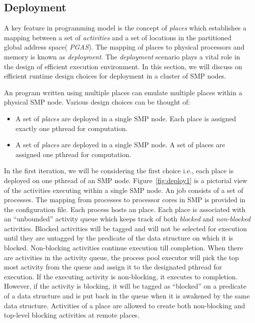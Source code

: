 \subsection{Deployment}
\label{sec:deploy}

A key feature in \Xten{} programming model is the concept of {\it
places} which establishes a mapping between a set of {\it activities}
and a set of locations in the partitioned global address space({\it
PGAS}). The mapping of places to physical processors and memory is
known as {\it deployment}. The {\it deployment} scenario plays a vital
role in the design of efficient \Xten{} execution environment. In this
section, we will discuss on efficient \Xten{} runtime design choices
for deployment in a cluster of SMP nodes.

An \Xten{} program written using multiple places can emulate multiple
places within a physical SMP node. Various design choices can be
thought of:

\begin{itemize}
\item A set of \Xten{} {\it places} are deployed in a single SMP node.
Each \Xten{} place is assigned exactly one pthread for computation.

\item A set of \Xten{} {\it places} are deployed in a single SMP node.
A set of \Xten{} places are assigned one pthread for computation.
\end{itemize}

In the first iteration, we will be considering the first choice i.e.,
each \Xten{} place is deployed on one pthread of an SMP
node. Figure~\ref{fig:deploy1} is a pictorial view of the activities
executing within a single SMP node. An \Xten{} job consists of a set
of \Xten{} processes. The mapping from processes to processor cores in SMP
is provided in the configuration file. Each \Xten{} process hosts an
\Xten{} place. Each \Xten{} place is associated with an ``unbounded'' 
activity queue which keeps track of both {\it blocked} and {\it
non-blocked} activities. Blocked activities will be tagged and will
not be selected for execution until they are untagged by the predicate
of the data structure on which it is blocked. Non-blocking activities
continue execution till completion. When there are activities in the
activity queue, the \Xten{} process pool executor will pick the top
most activity from the queue and assign it to the designated pthread
for execution.  If the executing activity is non-blocking, it executes
to completion. However, if the activity is blocking, it will be tagged
as ``blocked'' on a predicate of a data structure and is put back in
the queue when it is awakened by the same data structure. Activities
of a \Xten{} place are allowed to create both non-blocking and
top-level blocking activities at remote places.

